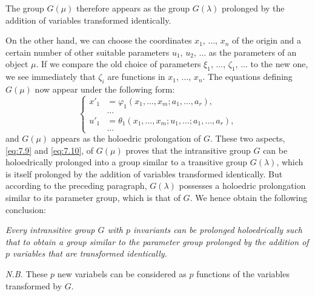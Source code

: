 \documentclass[leqno,11pt]{book}
\makeatletter
\numberwithin{equation}{chapter}
\theoremstyle{shape1}
\theoremstyle{shapesmall}
\let\old@phi\phi
\let\old@varphi\varphi
\let\phi\old@varphi
\let\varphi\old@phi
\newcommand{\somespace}{\vspace{9pt}}
\makeatother
\begin{document}
The group $G(\mu)$ therefore appears as the group $G(\lambda)$ prolonged by the addition of variables transformed identically.

On the other hand, we can choose the coordinates $x_{1}$, $\dots$, $x_{n}$ of the origin and a certain number of other suitable parameters $u_{1}$, $u_{2}$, $\dots$ as the parameters of an object $\mu$. If we compare the old choice of parameters $\xi_{1}$, $\dots$, $\zeta_{1}$, $\dots$ to the new one, we see immediately that $\zeta_{i}$ are functions in $x_{1}$, $\dots$, $x_{n}$. The equations defining $G(\mu)$ now appear under the following form:
\begin{equation}
  \label{eq:7.11}
  \left\{
    \begin{aligned}
      x'_{1}&=\phi_{1}(x_{1},\dots,x_{m};a_{1},\dots,a_{r}),\\
      &\dots\\
      u'_{1}&=\theta_{1}(x_{1},\dots,x_{m};u_{1},\dots;a_{1},\dots,a_{r}),\\
      &\dots
    \end{aligned}
  \right.
\end{equation}
and $G(\mu)$ appears as the holoedric prolongation of $G$. These two aspects, \eqref{eq:7.9} and \eqref{eq:7.10}, of $G(\mu)$ proves that the intransitive group $G$ can be holoedrically prolonged into a group similar to a transitive group $G(\lambda)$, which is itself prolonged by the addition of variables transformed identically. But according to the preceding paragraph, $G(\lambda)$ possesses a holoedric prolongation similar to its parameter group, which is that of $G$. We hence obtain the following conclusion:

\somespace

\emph{Every intransitive group $G$ with $p$ invariants can be prolonged holoedrically such that to obtain a group similar to the parameter group prolonged by the addition of $p$ variables that are transformed identically.}

\somespace

\emph{N.B.} These $p$ new variabels can be considered as $p$ functions of the variables transformed by $G$.
\end{document}
